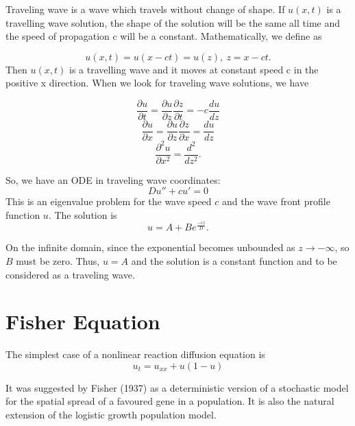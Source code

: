 \documentclass[]{article}
\numberwithin{equation}{section}		%
\def\beq{\begin{equation}}
\def\eeq{\end{equation}}
\begin{document}
Traveling wave is a  wave which travels without change of shape. If $u(x,t)$ is a travelling wave solution, the shape of the solution will be the same all time and the speed of propagation c will be a constant. Mathematically, we define as

\beq
	u(x,t)= u(x-ct)=u(z), \ z=x-ct.
\eeq
\noindent Then $u(x,t)$ is a travelling wave and it moves at constant speed c in the positive x direction. When we look for traveling wave solutions, we have

\begin{equation}
\frac{\partial u}{\partial t} = \frac{\partial u}{\partial z} \frac{\partial z}{\partial t}= -c \frac{du}{dz} \nonumber
\end{equation}
\begin{equation}
\frac{\partial u}{\partial x} = \frac{\partial u}{\partial z} \frac{\partial z}{\partial x}= \frac{du}{dz} \nonumber
\end{equation}
\begin{equation}
\frac{\partial^2 u}{\partial x^2} = \frac{d^2}{d z^2}.  \nonumber
\end{equation}

\noindent So, we have an ODE in traveling wave coordinates:
\begin{equation}
    Du''+cu'=0
\end{equation}
This is an eigenvalue problem for the wave speed $c$ and the wave
front profile function $u$. The solution is
\begin{equation}
    u=A+Be^{\frac{-cz}{D}}.
\end{equation}

On the infinite domain, since the exponential becomes unbounded as
$z \rightarrow-\infty$, so $B$ must be zero. Thus, $u=A$ and the
solution is a constant function and to be considered as a traveling wave.

\section{Fisher Equation}
The simplest case of a nonlinear reaction diffusion equation is
\begin{equation}
	u_t=u_{xx}+u(1-u)
\end{equation}

It was suggested by Fisher (1937) as a deterministic version of a stochastic model for the spatial spread of a favoured gene in a population. It is also the natural extension of the logistic growth population model.
\end{document}
